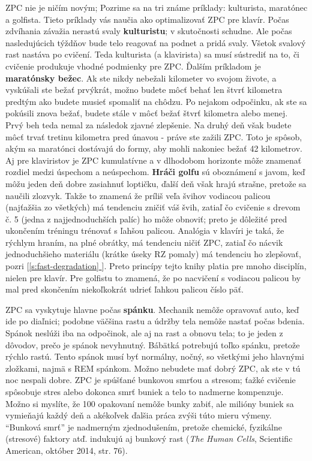 \documentclass[11pt,a4paper]{book}
\newcommand*{\fullref}[1]{\hyperref[{#1}]{\ref*{#1} \nameref*{#1}}} %
\newcommand*{\fullrefp}[1]{[\fullref{#1}]} %
\begin{document}
ZPC nie je ničím novým; Pozrime sa na tri známe príklady: kulturista, maratónec a golfista. Tieto príklady vás naučia ako optimalizovať ZPC pre klavír. Počas zdvíhania závažia nerastú svaly \textbf{kulturistu}; v skutočnosti schudne. Ale počas nasledujúcich týždňov bude telo reagovať na podnet a pridá svaly. Všetok svalový rast nastáva po cvičení. Teda kulturista (a klavirista) sa musí sústrediť na to, či cvičenie produkuje vhodné podmienky pre ZPC. Ďalším príkladom je \textbf{maratónsky bežec}. Ak ste nikdy nebežali kilometer vo svojom živote, a vyskúšali ste bežať prvýkrát, možno budete môcť behať len štvrť kilometra  predtým ako budete musieť spomaliť na chôdzu. Po nejakom odpočinku, ak ste sa pokúsili znova bežať, budete stále v môcť bežať štvrť kilometra alebo menej. Prvý beh teda nemal za následok zjavné zlepšenie. Na druhý deň však budete môcť trvať tretinu kilometra pred únavou - práve ste zažili ZPC. Toto je spôsob, akým sa maratónci dostávajú do formy, aby mohli nakoniec bežať 42 kilometrov. Aj pre klaviristov je ZPC kumulatívne a v dlhodobom horizonte môže znamenať rozdiel medzi úspechom a neúspechom. \textbf{Hráči golfu} sú oboznámení s javom, keď môžu jeden deň dobre zasiahnuť loptičku, ďalší deň však hrajú strašne, pretože sa naučili zlozvyk. Takže to znamená že príliš veľa švihov vodiacou palicou (najťažšia zo všetkých) má tendenciu zničiť váš švih, zatiaľ čo cvičenie s drevom č. 5 (jedna z najjednoduchších palíc) ho môže obnoviť; preto je dôležité pred ukončením tréningu trénovať s ľahšou palicou. Analógia v klavíri je taká, že rýchlym hraním, na plné obrátky, má tendenciu ničiť ZPC, zatiaľ čo nácvik jednoduchšieho materiálu (krátke úseky RZ pomaly) má tendenciu ho zlepšovať, pozri \fullrefp{s:fast-degradation}. Preto princípy tejto knihy platia pre mnoho disciplín, nielen pre klavír. Pre golfistu to znamená, že po nacvičení s vodiacou palicou by mal pred skončením niekoľkokrát udrieť ľahkou palicou číslo päť.

ZPC sa vyskytuje hlavne počas \textbf{spánku}. Mechanik nemôže opravovať auto, keď ide po diaľnici; podobne väčšina rastu a údržby tela nemôže nastať počas bdenia. Spánok neslúži iba na odpočinok, ale aj na rast a obnovu tela; to je jeden z dôvodov, prečo je spánok nevyhnutný. Bábätká potrebujú toľko spánku, pretože rýchlo rastú. Tento spánok musí byť normálny, nočný, so všetkými jeho hlavnými zložkami, najmä s REM spánkom. Možno nebudete mať dobrý ZPC, ak ste v tú noc nespali dobre. ZPC je spúšťané bunkovou smrťou a stresom; ťažké cvičenie spôsobuje stres alebo dokonca smrť buniek a telo to nadmerne kompenzuje. Možno si myslíte, že 100 opakovaní nemôže bunky zabiť, ale milióny buniek sa vymieňajú každý deň a akékoľvek ďalšia práca zvýši túto mieru výmeny. “Bunková smrť” je nadmerným zjednodušením, pretože chemické, fyzikálne (stresové) faktory atď. indukujú aj bunkový rast (\textit{The Human Cells}, Scientific American, október 2014, str. 76). 
\end{document}
